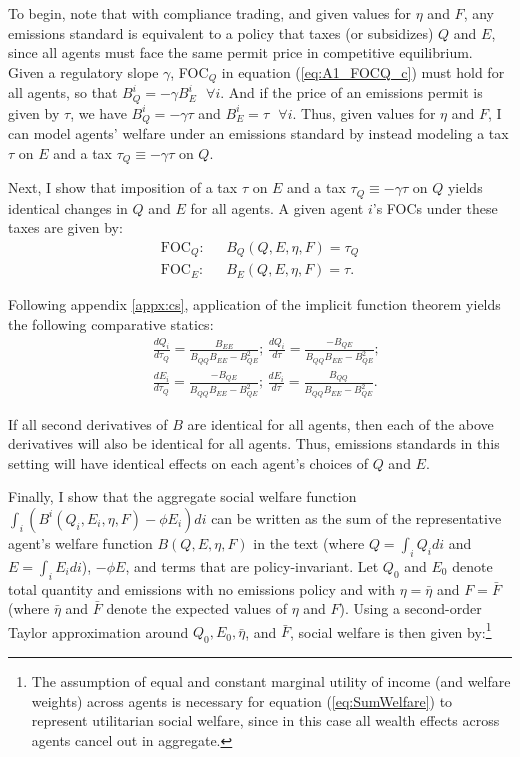 \documentclass[12pt]{article}
\begin{document}
To begin, note that with compliance trading, and given values for $\eta$ and $F$, any emissions standard is equivalent to a policy that taxes (or subsidizes) $Q$ and $E$, since all agents must face the same permit price in competitive equilibrium. Given a regulatory slope $\gamma$, FOC$_Q$ in equation (\ref{eq:A1_FOCQ_c}) must hold for all agents, so that $B_Q^i=-\gamma B_E^i\text{ }\forall i$. And if the price of an emissions permit is given by $\tau$, we have $B_Q^i=-\gamma\tau$ and $B_E^i=\tau\text{ }\forall i$. Thus, given values for $\eta$ and $F$, I can model agents' welfare under an emissions standard by instead modeling a tax $\tau$ on $E$ and a tax $\tau_Q\equiv-\gamma\tau$ on $Q$.

Next, I show that imposition of a tax $\tau$ on $E$ and a tax $\tau_Q\equiv-\gamma\tau$ on $Q$ yields identical changes in $Q$ and $E$ for all agents. A given agent $i$'s FOCs under these taxes are given by:
\begin{align}
\text{FOC}_Q:& \text{ } B_Q(Q,E,\eta,F)=\tau_Q  \\
\text{FOC}_E:& \text{ } B_E(Q,E,\eta,F)=\tau.
\end{align}

Following appendix \ref{appx:cs}, application of the implicit function theorem yields the following comparative statics:
\begin{align}
&\frac{dQ_i}{d\tau_Q}=\frac{B_{EE}}{B_{QQ}B_{EE}-B_{QE}^2}\text{; } \frac{dQ_i}{d\tau}=\frac{-B_{QE}}{B_{QQ}B_{EE}-B_{QE}^2}\text{;} \\
&\frac{dE_i}{d\tau_Q}=\frac{-B_{QE}}{B_{QQ}B_{EE}-B_{QE}^2}\text{; } \frac{dE_i}{d\tau}=\frac{B_{QQ}}{B_{QQ}B_{EE}-B_{QE}^2}. 
\end{align}

If all second derivatives of $B$ are identical for all agents, then each of the above derivatives will also be identical for all agents. Thus, emissions standards in this setting will have identical effects on each agent's choices of $Q$ and $E$.

Finally, I show that the aggregate social welfare function $\int_i(B^i(Q_i,E_i,\eta,F)-\phi E_i)di$ can be written as the sum of the representative agent's welfare function $B(Q,E,\eta,F)$ in the text (where $Q=\int_i Q_idi$ and $E=\int_i E_idi$), $-\phi E$, and terms that are policy-invariant. Let $Q_0$ and $E_0$ denote total quantity and emissions with no emissions policy and with $\eta=\bar{\eta}$ and $F=\bar{F}$ (where $\bar{\eta}$ and $\bar{F}$ denote the expected values of $\eta$ and $F$). Using a second-order Taylor approximation around $Q_0,E_0,\bar{\eta}$, and $\bar{F}$, social welfare is then given by:\footnote{The assumption of equal and constant marginal utility of income (and welfare weights) across agents is necessary for equation (\ref{eq:SumWelfare}) to represent utilitarian social welfare, since in this case all wealth effects across agents cancel out in aggregate.}
\end{document}
